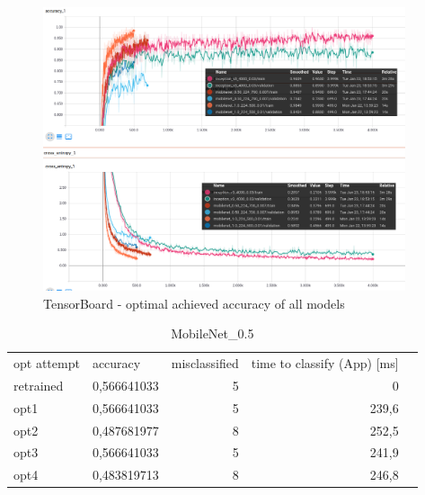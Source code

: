 \begin{figure}[htbp]
\centering
\includegraphics[width=0.95\textwidth]{includes/AllRes}
\caption{TensorBoard - optimal achieved accuracy of all models}
\label{fig:AllRes}
\end{figure}

\newpage


\newpage
\begin{table}[]
\centering
\begin{tabular}{|l|r|r|r|l}
\cline{1-4}
opt attempt & \multicolumn{1}{l|}{accuracy} & \multicolumn{1}{l|}{misclassified} & \multicolumn{1}{l|}{time to classify (App) {[}ms{]}} &  \\ \cline{1-4}
retrained & 0,566641033                   & 5                                           & 0                                &  \\ \cline{1-4}
opt1      & 0,566641033                   & 5                                           & 239,6                           &  \\ \cline{1-4}
opt2      & 0,487681977                   & 8                                           & 252,5                           &  \\ \cline{1-4}
opt3      & 0,566641033                   & 5                                           & 241,9                   &  \\ \cline{1-4}
opt4      & 0,483819713                   & 8                                           & 246,8                            &  \\ \cline{1-4}
\end{tabular}
\caption{MobileNet_0.5}
\label{tab:mobileNet05}
\end{table}

